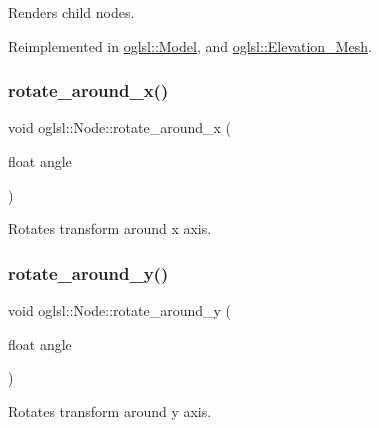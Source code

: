 Renders child nodes. 



Reimplemented in \mbox{\hyperlink{classoglsl_1_1_model_a22b769c49add4d10774e90466338c695}{oglsl\+::\+Model}}, and \mbox{\hyperlink{classoglsl_1_1_elevation___mesh_afb39dc1633680dccabb4b8da72ac4733}{oglsl\+::\+Elevation\+\_\+\+Mesh}}.

\mbox{\label{classoglsl_1_1_node_ab3463958740710e6af2a502ecd10d5ba}} 
\subsubsection{\texorpdfstring{rotate\+\_\+around\+\_\+x()}{rotate\_around\_x()}}
{\footnotesize\ttfamily void oglsl\+::\+Node\+::rotate\+\_\+around\+\_\+x (\begin{DoxyParamCaption}\item[{float}]{angle }\end{DoxyParamCaption})\hspace{0.3cm}{\ttfamily [inline]}}



Rotates transform around x axis. 

\mbox{\label{classoglsl_1_1_node_a18862e40a37f13088bf454eb113e42d6}} 
\subsubsection{\texorpdfstring{rotate\+\_\+around\+\_\+y()}{rotate\_around\_y()}}
{\footnotesize\ttfamily void oglsl\+::\+Node\+::rotate\+\_\+around\+\_\+y (\begin{DoxyParamCaption}\item[{float}]{angle }\end{DoxyParamCaption})\hspace{0.3cm}{\ttfamily [inline]}}



Rotates transform around y axis. 

\mbox{\label{classoglsl_1_1_node_afcd334ef611ba394879cd32be71d4c43}} 
